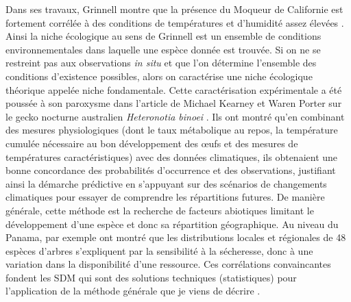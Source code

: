 Dans ses travaux, Grinnell montre que la présence du Moqueur de
Californie est fortement corrélée à des conditions de températures et
d'humidité assez élevées \citep{Grinnell1917a}. Ainsi la niche
écologique au sens de Grinnell est un ensemble de conditions
environnementales dans laquelle une espèce donnée est trouvée. Si on ne
se restreint pas aux observations \emph{in situ} et que l'on détermine
l'ensemble des conditions d'existence possibles, alors on caractérise
une niche écologique théorique appelée niche fondamentale. Cette
caractérisation expérimentale a été poussée à son paroxysme dans
l'article de Michael Kearney et Waren Porter sur le gecko nocturne
australien \emph{Heteronotia binoei} \citep{Kearney2004}. Ils ont montré
qu'en combinant des mesures physiologiques (dont le taux métabolique au
repos, la température cumulée nécessaire au bon développement des œufs
et des mesures de températures caractéristiques) avec des données
climatiques, ils obtenaient une bonne concordance des probabilités
d'occurrence et des observations, justifiant ainsi la démarche
prédictive en s'appuyant sur des scénarios de changements climatiques
pour essayer de comprendre les répartitions futures. De manière
générale, cette méthode est la recherche de facteurs abiotiques limitant
le développement d'une espèce et donc sa répartition géographique. Au
niveau du Panama, par exemple \citet{Engelbrecht2007} ont montré que les
distributions locales et régionales de 48 espèces d'arbres s'expliquent
par la sensibilité à la sécheresse, donc à une variation dans la
disponibilité d'une ressource. Ces corrélations convaincantes fondent
les SDM qui sont des solutions techniques (statistiques) pour
l'application de la méthode générale que je viens de décrire
\citep{Elith2006, Elith2009a}.

